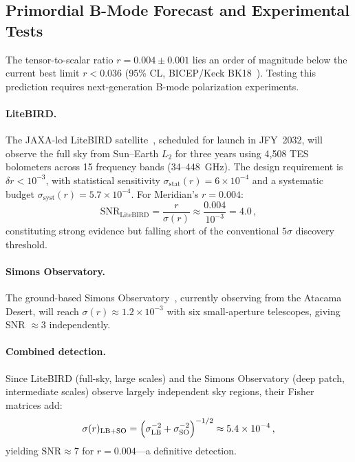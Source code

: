 \subsection{Primordial B-Mode Forecast and Experimental Tests}
\label{sec:4-bmode-forecast}

The tensor-to-scalar ratio $r = 0.004 \pm 0.001$ lies an order of magnitude below the current best limit $r < 0.036$ (95\% CL, BICEP/Keck BK18~\cite{ch4:BK18}). Testing this prediction requires next-generation B-mode polarization experiments.

\paragraph{LiteBIRD.} The JAXA-led LiteBIRD satellite~\cite{ch4:LiteBIRD2023}, scheduled for launch in JFY~2032, will observe the full sky from Sun--Earth $L_2$ for three years using 4{,}508 TES bolometers across 15 frequency bands (34--448~GHz). The design requirement is $\delta r < 10^{-3}$, with statistical sensitivity $\sigma_{\mathrm{stat}}(r) = 6 \times 10^{-4}$ and a systematic budget $\sigma_{\mathrm{syst}}(r) = 5.7 \times 10^{-4}$. For Meridian's $r = 0.004$:
\begin{equation}
  \mathrm{SNR}_{\mathrm{LiteBIRD}} = \frac{r}{\sigma(r)} \approx \frac{0.004}{10^{-3}} = 4.0\,,
  \label{eq:4-SNR-LB}
\end{equation}
constituting strong evidence but falling short of the conventional $5\sigma$ discovery threshold.

\paragraph{Simons Observatory.} The ground-based Simons Observatory~\cite{ch4:SO2019}, currently observing from the Atacama Desert, will reach $\sigma(r) \approx 1.2 \times 10^{-3}$ with six small-aperture telescopes, giving SNR $\approx 3$ independently.

\paragraph{Combined detection.} Since LiteBIRD (full-sky, large scales) and the Simons Observatory (deep patch, intermediate scales) observe largely independent sky regions, their Fisher matrices add:
\begin{equation}
  \sigma(r)_{\mathrm{LB+SO}} = \Bigl(\sigma_{\mathrm{LB}}^{-2} + \sigma_{\mathrm{SO}}^{-2}\Bigr)^{-1/2} \approx 5.4 \times 10^{-4}\,,
  \label{eq:4-sigma-combined}
\end{equation}
yielding $\mathrm{SNR} \approx 7$ for $r = 0.004$---a definitive detection.

